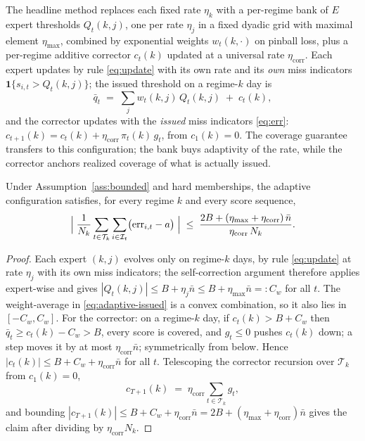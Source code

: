The headline method replaces each fixed rate $\eta_k$ with a per-regime
bank of $E$ expert thresholds $Q_t(k, j)$, one per rate $\eta_j$ in a
fixed dyadic grid with maximal element $\eta_{\max}$, combined by
exponential weights $w_t(k, \cdot)$ on pinball loss, plus a per-regime
additive corrector $c_t(k)$ updated at a universal rate
$\eta_{\mathrm{corr}}$. Each expert updates by rule \eqref{eq:update} with
its own rate and its \emph{own} miss indicators
$\mathbf{1}\{ s_{i,t} > Q_t(k, j) \}$; the issued threshold on a regime-$k$
day is
\begin{equation}\label{eq:adaptive-issued}
  \bar q_t \;=\; \textstyle\sum_j w_t(k, j)\, Q_t(k, j) \;+\; c_t(k),
\end{equation}
and the corrector updates with the \emph{issued} miss indicators
\eqref{eq:err}: $c_{t+1}(k) = c_t(k) + \eta_{\mathrm{corr}}\, \pi_t(k)\,
g_t$, from $c_1(k) = 0$. The coverage guarantee transfers to this
configuration; the bank buys adaptivity of the rate, while the corrector
anchors realized coverage of what is actually issued.

\begin{proposition}\label{prop:adaptive}
Under Assumption~\ref{ass:bounded} and hard memberships, the adaptive
configuration satisfies, for every regime $k$ and every score sequence,
\[
  \Bigl|\; \frac{1}{N_k} \sum_{t \in \mathcal{T}_k} \sum_{i \in \mathcal{I}_t}
     \bigl( \mathrm{err}_{i,t} - a \bigr) \;\Bigr|
  \;\le\; \frac{ 2B + (\eta_{\max} + \eta_{\mathrm{corr}})\, \bar n }
               { \eta_{\mathrm{corr}} \, N_k }.
\]
\end{proposition}

\begin{proof}
Each expert $(k, j)$ evolves only on regime-$k$ days, by rule
\eqref{eq:update} at rate $\eta_j$ with its own miss indicators; the
self-correction argument therefore applies expert-wise and gives
$|Q_t(k, j)| \le B + \eta_j \bar n \le B + \eta_{\max} \bar n =: C_w$
for all $t$. The weight-average in \eqref{eq:adaptive-issued} is a convex
combination, so it also lies in $[-C_w, C_w]$. For the corrector: on a
regime-$k$ day, if $c_t(k) > B + C_w$ then
$\bar q_t \ge c_t(k) - C_w > B$, every score is covered, and
$g_t \le 0$ pushes $c_t(k)$ down; a step moves it by at most
$\eta_{\mathrm{corr}} \bar n$; symmetrically from below. Hence
$|c_t(k)| \le B + C_w + \eta_{\mathrm{corr}} \bar n$ for all $t$.
Telescoping the corrector recursion over $\mathcal{T}_k$ from
$c_1(k) = 0$,
\[
  c_{T+1}(k) \;=\; \eta_{\mathrm{corr}} \sum_{t \in \mathcal{T}_k} g_t ,
\]
and bounding $|c_{T+1}(k)| \le B + C_w + \eta_{\mathrm{corr}} \bar n =
2B + (\eta_{\max} + \eta_{\mathrm{corr}}) \bar n$ gives the claim after
dividing by $\eta_{\mathrm{corr}} N_k$.
\end{proof}

